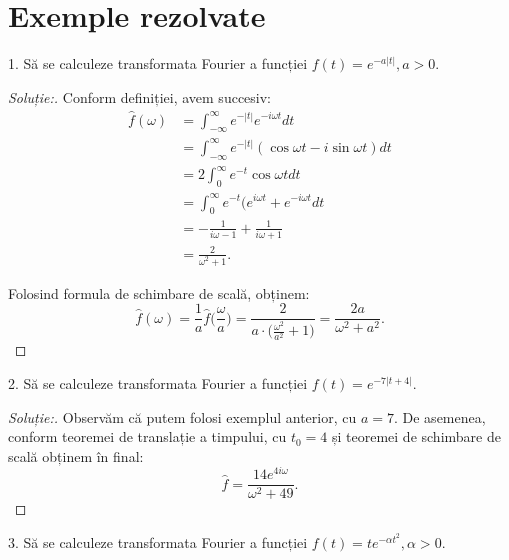 \documentclass[12pt,a4paper]{article}
\theoremstyle{dotless}
\theoremstyle{dotlessdr}
\newenvironment{solution}
{\begin{proof}[Soluție:\nopunct]}
  {\end{proof}}
\begin{document}

\section*{Exemple rezolvate}

1. Să se calculeze transformata Fourier a funcției $ f(t) = e^{-a|t|}, a > 0 $.

\begin{solution} Conform definiției, avem succesiv:
  \begin{align*}
    \widehat{f}(\omega) &= \int_{-\infty}^\infty e^{-|t|} e^{-i\omega t} dt \\
                        &= \int_{-\infty}^\infty e^{-|t|} (\cos \omega t - i \sin \omega t) dt \\
                        &= 2 \int_0^{\infty} e^{-t} \cos \omega t dt \\
                        &= \int_0^\infty e^{-t} (e^{i\omega t} + e^{-i\omega t} dt \\
                        &= -\frac{1}{i\omega - 1} + \frac{1}{i \omega + 1} \\
                        &= \frac{2}{\omega^2 + 1}.
  \end{align*}

  Folosind formula de schimbare de scală, obținem:
  \[
    \widehat{f}(\omega) = \frac{1}{a} \widehat{f} \Big( \frac{\omega}{a} \Big) = %
    \frac{2}{a \cdot \big( \frac{\omega^2}{a^2} + 1 \big)} = %
    \frac{2a}{\omega^2 + a^2}.
  \]
\end{solution}

\vspace{1cm}

2. Să se calculeze transformata Fourier a funcției $ f(t) = e^{-7|t + 4|} $.

\begin{solution}
  Observăm că putem folosi exemplul anterior, cu $ a = 7 $. De asemenea, conform teoremei
  de translație a timpului, cu $ t_0 = 4 $ și teoremei de schimbare de scală obținem în final:
  \[
    \widehat{f} = \frac{14 e^{4i\omega}}{\omega^2 + 49}.
  \]
\end{solution}

\vspace{1cm}

3. Să se calculeze transformata Fourier a funcției $ f(t) = te^{-\alpha t^2}, \alpha > 0 $.
\end{document}
